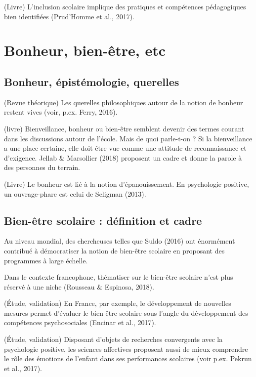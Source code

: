 \documentclass[
  french,
]{article}
\begin{document}
(Livre) L'inclusion scolaire implique des pratiques et compétences pédagogiques bien identifiées (Prud'Homme et al., 2017).

\hypertarget{bonheur-bien-uxeatre-etc}{%
\section{Bonheur, bien-être, etc}\label{bonheur-bien-uxeatre-etc}}

\hypertarget{bonheur-uxe9pistuxe9mologie-querelles}{%
\subsection{Bonheur, épistémologie, querelles}\label{bonheur-uxe9pistuxe9mologie-querelles}}

(Revue théorique) Les querelles philosophiques autour de la notion de bonheur restent vives (voir, p.ex. Ferry, 2016).

(livre) Bienveillance, bonheur ou bien-être semblent devenir des termes courant dans les discussions autour de l'école. Mais de quoi parle-t-on ? Si la bienveillance a une place certaine, elle doit être vue comme une attitude de reconnaissance et d'exigence. Jellab \& Marsollier (2018) proposent un cadre et donne la parole à des personnes du terrain.

(Livre) Le bonheur est lié à la notion d'épanouissement. En psychologie positive, un ouvrage-phare est celui de Seligman (2013).

\hypertarget{bien-uxeatre-scolaire-duxe9finition-et-cadre}{%
\subsection{Bien-être scolaire : définition et cadre}\label{bien-uxeatre-scolaire-duxe9finition-et-cadre}}

Au niveau mondial, des chercheuses telles que Suldo (2016) ont énormément contribué à démocratiser la notion de bien-être scolaire en proposant des programmes à large échelle.

Dans le contexte francophone, thématiser sur le bien-être scolaire n'est plus réservé à une niche (Rousseau \& Espinosa, 2018).

(Étude, validation) En France, par exemple, le développement de nouvelles mesures permet d'évaluer le bien-être scolaire sous l'angle du développement des compétences psychosociales (Encinar et al., 2017).

(Étude, validation) Disposant d'objets de recherches convergents avec la psychologie positive, les sciences affectives proposent aussi de mieux comprendre le rôle des émotions de l'enfant dans ses performances scolaires (voir p.ex. Pekrun et al., 2017).
\end{document}
